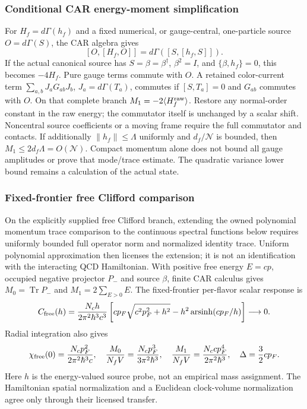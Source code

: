 \documentclass[12pt,a4paper]{article}
\begin{document}
\subsubsection{Conditional CAR energy-moment simplification}
\label{p10:app:clifford-chiral-moment}
For $H_f=d\Gamma(h_f)$ and a fixed numerical, or gauge-central,
one-particle source $O=d\Gamma(S)$, the CAR algebra gives
\[
 [O,[H_f,O]]=d\Gamma([S,[h_f,S]]).
\]
If the actual canonical source has $S=\beta=\beta^\dagger$,
$\beta^2=I$, and $\{\beta,h_f\}=0$, this becomes $-4H_f$.
Pure gauge terms commute with $O$. A retained color-current term
$\sum_{a,b}J_aG_{ab}J_b$, $J_a=d\Gamma(T_a)$, commutes if
$[S,T_a]=0$ and $G_{ab}$ commutes with $O$.
On that complete branch $M_1=-2\langle H_f^{\rm raw}\rangle$.
Restore any normal-order constant in the raw energy; the commutator
itself is unchanged by a scalar shift. Noncentral source coefficients
or a moving frame require the full commutator and contacts.
If additionally $\|h_f\|\le\Lambda$ uniformly and
$d_f/\mathcal N$ is bounded, then $M_1\le2d_f\Lambda=O(\mathcal N)$.
Compact momentum alone does not bound all gauge amplitudes or prove
that mode/trace estimate. The quadratic variance lower bound remains
a calculation of the actual state.


\subsubsection{Fixed-frontier free Clifford comparison}
\label{p10:app:free-chiral-comparison}
On the explicitly supplied free Clifford branch, extending the owned
polynomial momentum trace comparison to the continuous spectral
functions below requires uniformly bounded full operator norm and
normalized identity trace. Uniform polynomial approximation then
licenses the extension; it is not an identification with the interacting
QCD Hamiltonian.
With positive free energy $E=cp$, occupied negative projector $P_-$
and source $\beta$, finite CAR calculus gives
$M_0=\operatorname{Tr}P_-$ and $M_1=2\sum_{E>0}E$.
The fixed-frontier per-flavor scalar response is
\[
 C_{\rm free}(h)=\frac{N_ch}{2\pi^2\hbar^3c^3}
 \left[cp_F\sqrt{c^2p_F^2+h^2}
       -h^2\operatorname{arsinh}(cp_F/h)\right]\longrightarrow0.
\]
Radial integration also gives
\[
 \chi_{\rm free}(0)=\frac{N_cp_F^2}{2\pi^2\hbar^3c},\quad
 \frac{M_0}{N_fV}=\frac{N_cp_F^3}{3\pi^2\hbar^3},\quad
 \frac{M_1}{N_fV}=\frac{N_ccp_F^4}{2\pi^2\hbar^3},\quad
 \Delta=\frac32cp_F.
\]
Here $h$ is the energy-valued source probe, not an empirical mass
assignment. The Hamiltonian spatial normalization and a Euclidean
clock-volume normalization agree only through their licensed transfer.
\end{document}
